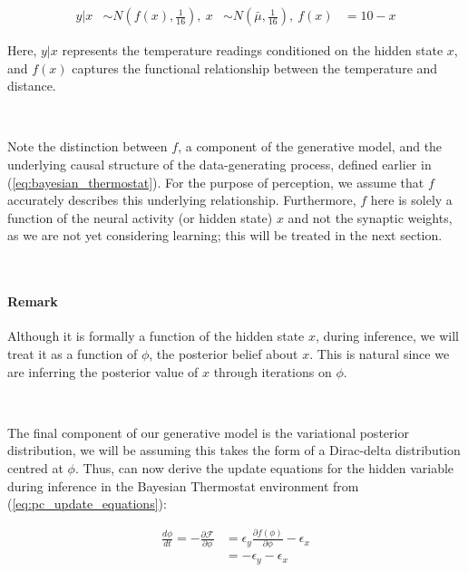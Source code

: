 \documentclass{article}
\newcommand{\refp}[1]{(\ref{#1})}
\begin{document}
\begin{equation}\label{eq:bayesian_thermostat_generative_model}
	\begin{aligned}
		y | x &\sim N\left(f(x), \frac{1}{16}\right), \  x &\sim N\left(\bar{\mu}, \frac{1}{16}\right) ,\ f(x) &= 10 - x
	\end{aligned}
\end{equation}

Here, $y | x$ represents the temperature readings conditioned on the hidden state $x$, and $f(x)$ captures the functional relationship between the temperature and distance.

\

Note the distinction between $f$, a component of the generative model, and the underlying causal structure of the data-generating process, defined earlier in \refp{eq:bayesian_thermostat}. For the purpose of perception, we assume that $f$ accurately describes this underlying relationship. Furthermore, $f$ here is solely a function of the neural activity (or hidden state) $x$ and not the synaptic weights, as we are not yet considering learning; this will be treated in the next section.

\

\paragraph{Remark} Although it is formally a function of the hidden state $x$, during inference, we will treat it as a function of $\phi$, the posterior belief about $x$. This is natural since we are inferring the posterior value of $x$ through iterations on $\phi$.

\

The final component of our generative model is the variational posterior distribution, we will be assuming this takes the form of a Dirac-delta distribution centred at $\phi$. Thus, can now derive the update equations for the hidden variable during inference in the Bayesian Thermostat environment from \refp{eq:pc_update_equations}: 

\begin{equation}\label{eq:pc_perception_phi}
	\begin{aligned}
		\frac{d \phi}{dt} = -\frac{\partial \mathcal{F}}{\partial \phi} &= \epsilon_y \frac{\partial f(\phi)}{\partial \phi} - \epsilon_x \\
		&= -\epsilon_y - \epsilon_x \\
    \end{aligned}
\end{equation}
\end{document}
